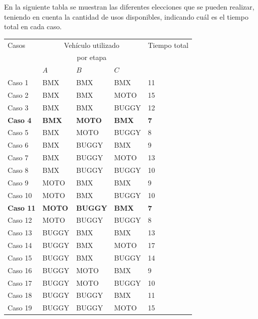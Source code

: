 \newpage

En la siguiente tabla se muestran las diferentes elecciones que se pueden realizar,
teniendo en cuenta la cantidad de usos disponibles, indicando cu\'al es el tiempo total en cada caso.\\

\begin{table}[htb]
\centering
\begin{tabular}[c]{|l|l|l|l|l|}

		\hline
		Casos &\multicolumn{3}{|c|}{Veh\'iculo utilizado}& Tiempo total \\
		&\multicolumn{3}{|c|}{por etapa}&   \\
		\cline{2-4}
		&  $A$  &  $B$  &  $C$ &  \\
		\hline
		Caso 1& BMX & BMX & BMX & 11 \\
		\hline
		Caso 2& BMX & BMX & MOTO & 15 \\
		\hline
		Caso 3& BMX & BMX & BUGGY & 12 \\
		\hline
		\textbf{Caso 4}& \textbf{BMX} & \textbf{MOTO} & \textbf{BMX} & \textbf{7} \\
		\hline
		Caso 5& BMX & MOTO & BUGGY & 8 \\
		\hline		
		Caso 6& BMX & BUGGY & BMX & 9 \\
		\hline
		Caso 7& BMX & BUGGY & MOTO & 13 \\
		\hline
		Caso 8& BMX & BUGGY & BUGGY & 10 \\
		\hline
		Caso 9& MOTO & BMX & BMX & 9\\
		\hline
		Caso 10& MOTO & BMX & BUGGY & 10 \\
		\hline
		\textbf{Caso 11}& \textbf{MOTO} & \textbf{BUGGY} & \textbf{BMX} & \textbf{7} \\
		\hline
		Caso 12& MOTO & BUGGY & BUGGY & 8 \\
		\hline
		Caso 13& BUGGY & BMX & BMX & 13 \\
		\hline
		Caso 14& BUGGY & BMX & MOTO & 17 \\
		\hline
		Caso 15& BUGGY & BMX & BUGGY & 14 \\
		\hline
		Caso 16& BUGGY & MOTO & BMX & 9 \\
		\hline
		Caso 17& BUGGY & MOTO & BUGGY & 10 \\
		\hline
		Caso 18& BUGGY & BUGGY & BMX & 11 \\
		\hline
		Caso 19& BUGGY & BUGGY & MOTO & 15 \\
		\hline
		
	\end{tabular}
\end{table}

